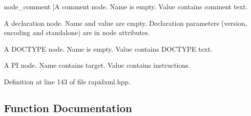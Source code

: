 \begin{Desc}
\begin{description}
{node\+\_\+comment\hypertarget{namespacerapidxml_abb456db38f7efb746c4330eed6072a7ca1a695e1384ec3bd4df3eff65ec609a96}{}\label{namespacerapidxml_abb456db38f7efb746c4330eed6072a7ca1a695e1384ec3bd4df3eff65ec609a96}
}]A comment node. Name is empty. Value contains comment text. \item[{\em 
node\+\_\+declaration\hypertarget{namespacerapidxml_abb456db38f7efb746c4330eed6072a7cafe4ca44261e5fbedf0eab43131751212}{}\label{namespacerapidxml_abb456db38f7efb746c4330eed6072a7cafe4ca44261e5fbedf0eab43131751212}
}]A declaration node. Name and value are empty. Declaration parameters (version, encoding and standalone) are in node attributes. \item[{\em 
node\+\_\+doctype\hypertarget{namespacerapidxml_abb456db38f7efb746c4330eed6072a7cadf5002f2efabe231bed01d16f08f832c}{}\label{namespacerapidxml_abb456db38f7efb746c4330eed6072a7cadf5002f2efabe231bed01d16f08f832c}
}]A D\+O\+C\+T\+Y\+PE node. Name is empty. Value contains D\+O\+C\+T\+Y\+PE text. \item[{\em 
node\+\_\+pi\hypertarget{namespacerapidxml_abb456db38f7efb746c4330eed6072a7caeb73b472e77347b9aa89525f16493b87}{}\label{namespacerapidxml_abb456db38f7efb746c4330eed6072a7caeb73b472e77347b9aa89525f16493b87}
}]A PI node. Name contains target. Value contains instructions. \end{description}
\end{Desc}


Definition at line 143 of file rapidxml.\+hpp.



\subsection{Function Documentation}
